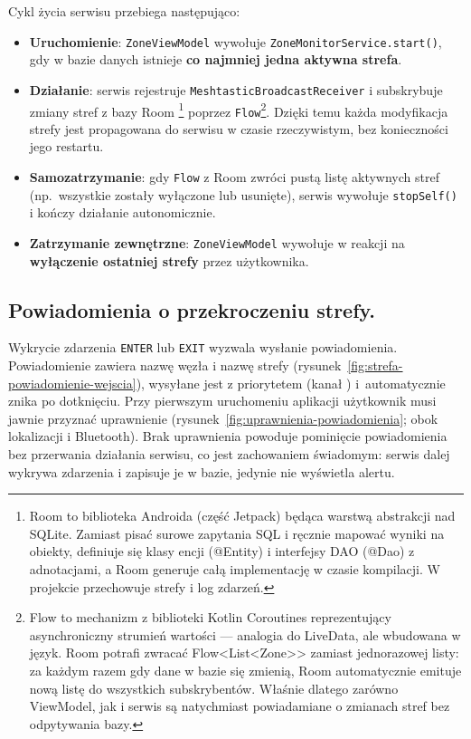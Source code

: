 Cykl życia serwisu przebiega następująco:
\begin{itemize}
    \item \textbf{Uruchomienie}: \texttt{ZoneViewModel} wywołuje \texttt{ZoneMonitorService.start()},
          gdy w bazie danych istnieje \textbf{co najmniej jedna aktywna strefa}.
    \item \textbf{Działanie}: serwis rejestruje \texttt{MeshtasticBroadcastReceiver}
          i subskrybuje zmiany stref z bazy Room \footnote{Room to biblioteka Androida (część Jetpack) będąca warstwą abstrakcji nad SQLite. Zamiast pisać surowe zapytania SQL i ręcznie mapować wyniki na obiekty, definiuje się klasy encji (@Entity) i interfejsy DAO (@Dao) z adnotacjami, a Room generuje całą implementację w czasie kompilacji. W projekcie przechowuje strefy i log zdarzeń.} poprzez \texttt{Flow}\footnote{Flow to mechanizm z biblioteki Kotlin Coroutines reprezentujący asynchroniczny strumień wartości — analogia do LiveData, ale wbudowana w język. Room potrafi zwracać Flow<List<Zone>> zamiast jednorazowej listy: za każdym razem gdy dane w bazie się zmienią, Room automatycznie emituje nową listę do wszystkich subskrybentów. Właśnie dlatego zarówno ViewModel, jak i serwis są natychmiast powiadamiane o zmianach stref bez odpytywania bazy.}. Dzięki temu każda
          modyfikacja strefy jest propagowana do serwisu w czasie rzeczywistym, bez
          konieczności jego restartu.
    \item \textbf{Samozatrzymanie}: gdy \texttt{Flow} z Room zwróci pustą listę aktywnych
          stref (np.\ wszystkie zostały wyłączone lub usunięte), serwis wywołuje
          \texttt{stopSelf()} i kończy działanie autonomicznie.
    \item \textbf{Zatrzymanie zewnętrzne}: \texttt{ZoneViewModel} wywołuje
          \texttt{} w reakcji na \textbf{wyłączenie ostatniej strefy}
          przez użytkownika.
\end{itemize}

\subsection*{Powiadomienia o przekroczeniu strefy.}

Wykrycie zdarzenia \texttt{ENTER} lub \texttt{EXIT} wyzwala wysłanie powiadomienia.
Powiadomienie zawiera nazwę węzła i nazwę strefy (rysunek~\ref{fig:strefa-powiadomienie-wejscia}), wysyłane jest z priorytetem \texttt{}
(kanał \texttt{}) i~automatycznie znika po dotknięciu.
Przy pierwszym uruchomeniu aplikacji użytkownik musi jawnie przyznać
uprawnienie \texttt{}
(rysunek~\ref{fig:uprawnienia-powiadomienia}; obok lokalizacji i Bluetooth). Brak uprawnienia powoduje pominięcie powiadomienia bez
przerwania działania serwisu, co jest zachowaniem świadomym: serwis dalej wykrywa zdarzenia
i zapisuje je w bazie, jedynie nie wyświetla alertu.

